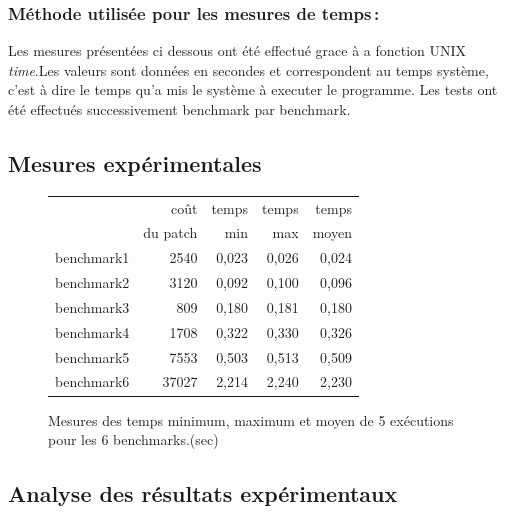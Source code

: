 \documentclass[a4paper, 10pt, french]{article}
\begin{document}
    \subsubsection{Méthode utilisée pour les mesures de temps\,: } 
      {Les mesures présentées ci dessous ont été effectué grace à a fonction UNIX {\em time}.Les valeurs sont données en secondes et correspondent au temps système, c'est à dire le temps qu'a mis le système à executer le programme. Les tests ont été effectués successivement benchmark par benchmark.
      }

  \subsection{Mesures expérimentales}
  
    \begin{figure}[h]
      \begin{center}
        \begin{tabular}{|l||r||r|r|r||}
          \hline
          \hline
            & coût         & temps     & temps   & temps \\
            & du patch     & min       & max     & moyen \\
          \hline
          \hline
            benchmark1 &2540 &0,023      &0,026     &0,024      \\
          \hline
            benchmark2 &3120      &0,092     &0,100     &0,096     \\
          \hline
            benchmark3 &809      &0,180     &0,181     &0,180     \\
          \hline
            benchmark4 &1708      &0,322     &0,330     &0,326     \\
          \hline
            benchmark5 &7553      &0,503     &0,513     &0,509     \\
          \hline
            benchmark6 &37027      &2,214     &2,240     &2,230     \\
          \hline
          \hline
        \end{tabular}
        \caption{Mesures des temps minimum, maximum et moyen de 5 exécutions pour les 6 benchmarks.(sec)}
        \label{table-temps}
      \end{center}
    \end{figure}

\subsection{Analyse des résultats expérimentaux}
\end{document}
